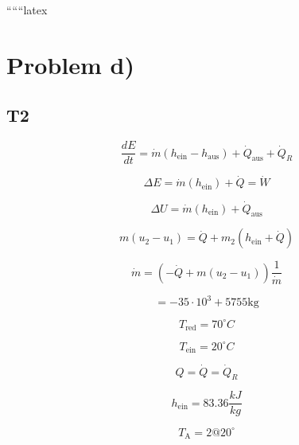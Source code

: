 
``````latex


\section*{Problem d)}

\subsection*{T2}

\begin{equation}
\frac{dE}{dt} = \dot{m} (h_{\text{ein}} - h_{\text{aus}}) + \dot{Q}_{\text{aus}} + \dot{Q}_{R}
\end{equation}

\begin{equation}
\Delta E = \dot{m} (h_{\text{ein}}) + \dot{Q} = \dot{W}
\end{equation}

\begin{equation}
\Delta U = \dot{m} (h_{\text{ein}}) + \dot{Q}_{\text{aus}}
\end{equation}

\begin{equation}
m (u_2 - u_1) = \dot{Q} + m_2 (h_{\text{ein}} + \dot{Q})
\end{equation}

\begin{equation}
\dot{m} = \left( -\dot{Q} + m (u_2 - u_1) \right) \frac{1}{\dot{m}}
\end{equation}

\begin{equation}
= -35 \cdot 10^3 + 5755 \text{kg}
\end{equation}

\begin{equation}
T_{\text{red}} = 70^\circ C
\end{equation}

\begin{equation}
T_{\text{ein}} = 20^\circ C
\end{equation}

\begin{equation}
Q = \dot{Q} = \dot{Q}_R
\end{equation}

\begin{equation}
h_{\text{ein}} = 83.36 \frac{kJ}{kg}
\end{equation}

\begin{equation}
T_{\text{A}} = 2 @ 20^\circ
\end{equation}

